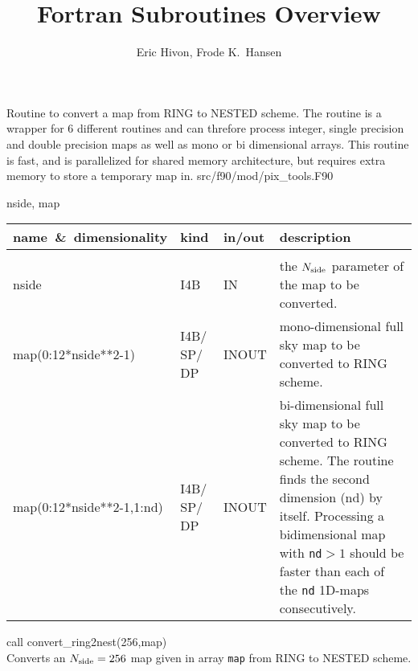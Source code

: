 
\sloppy


\title{\healpix Fortran Subroutines Overview}
 \section[convert\_ring2nest*]{ }
\label{sub:convert_ring2nest}
\author{Eric Hivon, Frode K.~Hansen}


\begin{facility}
{Routine to convert a \healpix map from RING to NESTED scheme. \newline
The routine is a
  wrapper for 6 different routines and can threfore process
  integer, single precision and double precision maps as well as mono or bi
  dimensional arrays. \newline This routine is fast, and is parallelized for shared memory
architecture, but requires extra memory to store a temporary map in. }
{src/f90/mod/pix\_tools.F90}
\end{facility}

\begin{f90format}
{nside, map}
\end{f90format}

\begin{arguments}
{
\begin{tabular}{p{0.4\hsize} p{0.05\hsize} p{0.1\hsize} p{0.35\hsize}} \hline  
\textbf{name~\&~dimensionality} & \textbf{kind} & \textbf{in/out} & \textbf{description} \\ \hline
                   &   &   &                           \\ %
nside & I4B & IN & the ${N_{\rm side}}$ parameter of the map to be converted. \\
map(0:12*nside**2-1) & I4B/ SP/ DP & INOUT & mono-dimensional full sky map to be converted to RING scheme. \\
map(0:12*nside**2-1,1:nd) & I4B/ SP/ DP & INOUT & bi-dimensional full sky map to
                   be converted to RING scheme. The routine finds the second
                   dimension (nd) by itself. Processing a bidimensional map with
{\tt nd}$>1$ should be
                   faster than each of the {\tt nd} 1D-maps consecutively.
\end{tabular}
}
\end{arguments}

\begin{example}
{
call convert\_ring2nest(256,map)  \\
}
{
Converts an ${N_{\rm side}}=256$ map given in array {\tt map} from RING to NESTED scheme.
}
\end{example}

